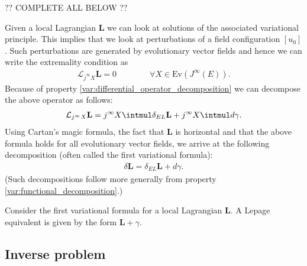     ?? COMPLETE ALL BELOW ??
    \begin{property}
        Given a local Lagrangian $\mathbf{L}$ we can look at solutions of the associated variational principle. This implies that we look at perturbations of a field configuration $[u_0]$. Such perturbations are generated by evolutionary vector fields and hence we can write the extremality condition as
        \begin{gather}
            \mathcal{L}_{j^\infty X}\mathbf{L} = 0\qquad\qquad\forall X\in\text{Ev}(J^\infty(E)).
        \end{gather}
        Because of property \ref{var:differential_operator_decomposition} we can decompose the above operator as follows:
        \begin{gather}
            \mathcal{L}_{j^\infty X}\mathbf{L} = j^\infty X\intmul\delta_{EL}\mathbf{L} + j^\infty X\intmul d\gamma.
        \end{gather}
        Using Cartan's magic formula, the fact that $\mathbf{L}$ is horizontal and that the above formula holds for all evolutionary vector fields, we arrive at the following decomposition (often called the first variational formula):
        \begin{gather}
            \label{var:first_variational_formula}
            \delta\mathbf{L} = \delta_{EL}\mathbf{L} + d\gamma.
        \end{gather}
        (Such decompositions follow more generally from property \ref{var:functional_decomposition}.)
    \end{property}

    \begin{property}
        Consider the first variational formula for a local Lagrangian $\mathbf{L}$. A Lepage equivalent is given by the form $\mathbf{L}+\gamma$.
    \end{property}

\subsection{Inverse problem}

